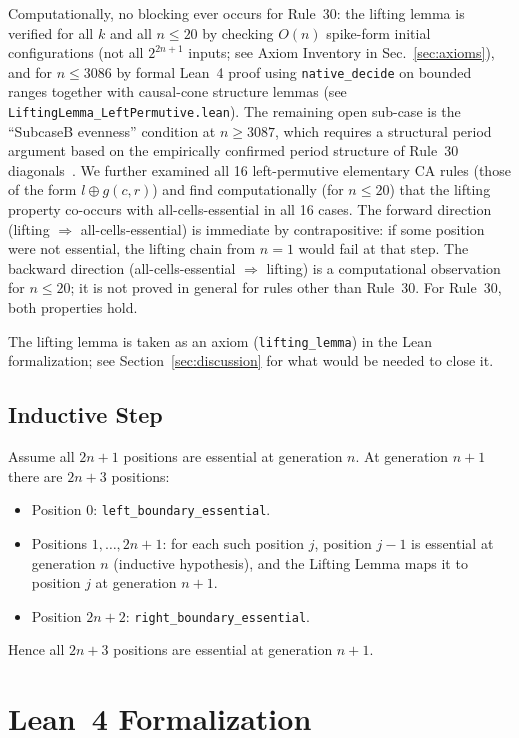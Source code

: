 \documentclass[11pt]{article}
\theoremstyle{plain}
\theoremstyle{definition}
\begin{document}
Computationally, no blocking ever occurs for Rule~30: the lifting lemma is verified
for all $k$ and all $n \leq 20$ by checking $O(n)$ spike-form initial configurations
(not all $2^{2n+1}$ inputs; see Axiom Inventory in Sec.~\ref{sec:axioms}),
and for $n \leq 3086$ by formal Lean~4 proof using \texttt{native\_decide} on bounded
ranges together with causal-cone structure lemmas (see \texttt{LiftingLemma\_LeftPermutive.lean}).
The remaining open sub-case is the ``SubcaseB evenness'' condition at $n \geq 3087$,
which requires a structural period argument based on the empirically confirmed period
structure of Rule~30 diagonals~\cite{Rowland2006}.
We further examined all 16 left-permutive elementary CA rules (those of the form
$l \oplus g(c,r)$) and find computationally (for $n \leq 20$) that the lifting
property co-occurs with all-cells-essential in all 16 cases.  The forward direction
(lifting $\Rightarrow$ all-cells-essential) is immediate by contrapositive: if some
position were not essential, the lifting chain from $n=1$ would fail at that step.
The backward direction (all-cells-essential $\Rightarrow$ lifting) is a computational
observation for $n \leq 20$; it is not proved in general for rules other than
Rule~30.  For Rule~30, both properties hold.

The lifting lemma is taken as an axiom (\texttt{lifting\_lemma}) in the Lean
formalization; see Section~\ref{sec:discussion} for what would be needed to
close it.

\subsection{Inductive Step}

Assume all $2n+1$ positions are essential at generation $n$.  At generation $n+1$
there are $2n+3$ positions:
\begin{itemize}
  \item Position $0$: \texttt{left\_boundary\_essential}.
  \item Positions $1, \ldots, 2n+1$: for each such position $j$, position $j-1$ is
    essential at generation $n$ (inductive hypothesis), and the Lifting Lemma maps
    it to position $j$ at generation $n+1$.
  \item Position $2n+2$: \texttt{right\_boundary\_essential}.
\end{itemize}
Hence all $2n+3$ positions are essential at generation $n+1$.

\section{Lean~4 Formalization}
\label{sec:lean}
\end{document}
